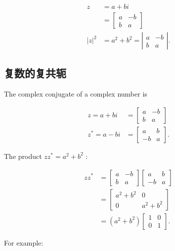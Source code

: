 $$
\begin{aligned}
z & =a+b i \\
& =\left[\begin{array}{cc}
a & -b \\
b & a
\end{array}\right] \\
|z|^{2} & =a^{2}+b^{2}=\left|\begin{array}{cc}
a & -b \\
b & a
\end{array}\right| .
\end{aligned}
$$

\subsection{复数的复共轭}
The complex conjugate of a complex number is

$$
\begin{aligned}
z=a+b i & =\left[\begin{array}{cc}
a & -b \\
b & a
\end{array}\right] \\
z^{*}=a-b i & =\left[\begin{array}{cc}
a & b \\
-b & a
\end{array}\right] .
\end{aligned}
$$

The product $z z^{*}=a^{2}+b^{2}$ :

$$
\begin{aligned}
z z^{*} & =\left[\begin{array}{cc}
a & -b \\
b & a
\end{array}\right]\left[\begin{array}{cc}
a & b \\
-b & a
\end{array}\right] \\
& =\left[\begin{array}{cc}
a^{2}+b^{2} & 0 \\
0 & a^{2}+b^{2}
\end{array}\right] \\
& =\left(a^{2}+b^{2}\right)\left[\begin{array}{ll}
1 & 0 \\
0 & 1
\end{array}\right] .
\end{aligned}
$$

For example:

